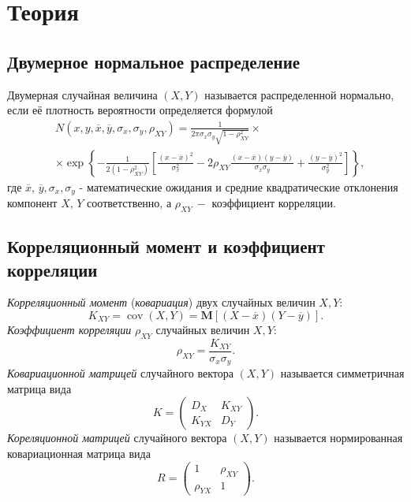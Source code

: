 \documentclass[a4paper,12pt]{article} %
\DeclareMathOperator{\cov}{cov}
\begin{document}
\section{Теория}
\subsection{Двумерное нормальное распределение}
Двумерная случайная величина $(X, Y)$ называется распределенной нормально, если её плотность вероятности определяется формулой
\begin{align}
    &N(x,y,\overline{x},\overline{y},\sigma_x,\sigma_y,\rho_{XY}^{})=\frac{1}{2\pi\sigma_x\sigma_y\sqrt{1-\rho_{XY}^2}}\times\nonumber\\
    &\times\exp\left\{-\frac{1}{2(1-\rho_{XY}^2)}\left[\frac{\left(x-\overline{x}\right)^2}{\sigma_x^2}-2\rho_{XY}^{}\frac{(x-\overline{x})(y-\overline{y})}{\sigma_x\sigma_y}+\frac{\left(y-\overline{y}\right)^2}{\sigma_y^2}\right]\right\},
\end{align}
где $\overline{x},\,\overline{y},\sigma_x,\sigma_y$ - математические ожидания и средние квадратические отклонения компонент $X,\,Y$ соответственно, а $\rho_{XY}^{}\:-$ коэффициент корреляции. 
\subsection{Корреляционный момент и коэффициент корреляции}
\textit{Корреляционный момент} (\textit{ковариация}) двух случайных величин $X, Y$:
\begin{equation}
    K_{X Y} = \cov{(X,Y)}=\mathbf{M}\left[(X-\overline{x})(Y-\overline{y})\right].
\end{equation}
\textit{Коэффициент корреляции} $\rho_{X Y}$ случайных величин $X,Y$:
\begin{equation}
    \rho_{X Y}^{}=\frac{K_{X Y}}{\sigma_x\sigma_y}.
\end{equation}
\textit{Ковариационной матрицей} случайного вектора $(X,Y)$ называется симметричная матрица вида
\begin{equation}
    K=\begin{pmatrix}
    D_X & K_{X Y} \\
    K_{Y X} & D_Y
    \end{pmatrix}.
\end{equation}
\textit{Кореляционной матрицей} случайного вектора $(X,Y)$ называется нормированная ковариационная матрица вида
\begin{equation}
    R=\begin{pmatrix}
    1 & \rho_{X Y}^{} \\
    \rho_{Y X}^{} & 1
    \end{pmatrix}.
\end{equation}
\end{document}
